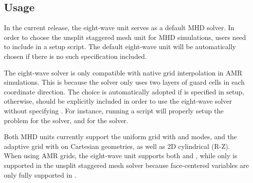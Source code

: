 \subsection{Usage}\label{Sec:MHD usage}

In the current release, the eight-wave unit serves as a default MHD
solver. %
In order to choose the unsplit staggered mesh unit for MHD simulations,
users need to include  in a setup script. The default eight-wave
unit will be automatically chosen if there is no such specification
included. 



\begin{flashtip} 
The eight-wave solver is only compatible with native grid interpolation in AMR
simulations.  This is because the solver only uses two layers of guard cells
in each coordinate direction. The choice 
is automatically adopted if  is specified in setup, otherwise,
 should be explicitly included in order
to use the eight-wave solver without specifying .
For instance, running a script  will
properly setup the  problem for the  solver, and
 for the  solver.
\end{flashtip}

\begin{flashtip}
Both MHD units currently support the uniform grid with
 and  modes, and
the adaptive grid with \Paramesh on Cartesian geometries, as well as
2D cylindrical (R-Z). 
When using AMR grids, the eight-wave unit supports both  and ,
while only  is supported in the unsplit staggered mesh solver
because face-centered variables are only fully supported in .
\end{flashtip}


